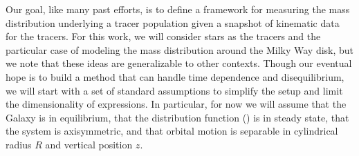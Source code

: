 Our goal, like many past efforts, is to define a framework for measuring the mass
distribution underlying a tracer population given a snapshot of kinematic data for the
tracers.
For this work, we will consider stars as the tracers and the particular case of modeling
the mass distribution around the Milky Way disk, but we note that these ideas are
generalizable to other contexts.
Though our eventual hope is to build a method that can handle time dependence and
disequilibrium, we will start with a set of standard assumptions to simplify the setup
and limit the dimensionality of expressions.
In particular, for now we will assume that the Galaxy is in equilibrium, that the
distribution function (\df) is in steady state, that the system is axisymmetric, and
that orbital motion is separable in cylindrical radius $R$ and vertical position $z$.

